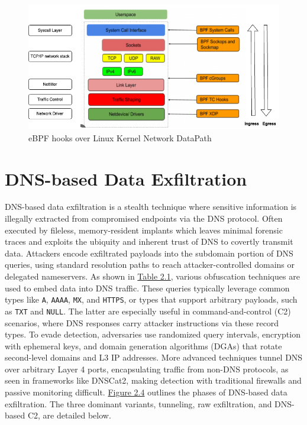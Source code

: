 \documentclass [11pt, proquest] {uwthesis}[2020/02/24]
\begin{document}




\begin{figure}
\includegraphics[width=1.0\textwidth]{images/kernel_datapath.png}
\caption{eBPF hooks over Linux Kernel Network DataPath}
\label{sec:ebpf-hooks-kernel-network-datapath}
\end{figure}


\section{DNS-based Data Exfiltration}
DNS-based data exfiltration is a stealth technique where sensitive information is illegally extracted from compromised endpoints via the DNS protocol. Often executed by fileless, memory-resident implants which leaves minimal forensic traces and exploits the ubiquity and inherent trust of DNS to covertly transmit data. Attackers encode exfiltrated payloads into the subdomain portion of DNS queries, using standard resolution paths to reach attacker-controlled domains or delegated nameservers. As shown in \hyperref[dns_payload_obfuscation]{Table 2.1}, various obfuscation techniques are used to embed data into DNS traffic. These queries typically leverage common types like \texttt{A}, \texttt{AAAA}, \texttt{MX}, and \texttt{HTTPS}, or types that support arbitrary payloads, such as \texttt{TXT} and \texttt{NULL}. The latter are especially useful in command-and-control (C2) scenarios, where DNS responses carry attacker instructions via these record types. To evade detection, adversaries use randomized query intervals, encryption with ephemeral keys, and domain generation algorithms (DGAs) that rotate second-level domains and L3 IP addresses. More advanced techniques tunnel DNS over arbitrary Layer 4 ports, encapsulating traffic from non-DNS protocols, as seen in frameworks like DNSCat2, making detection with traditional firewalls and passive monitoring difficult.
\hyperref[sec:dns c2 flow]{Figure 2.4} outlines the phases of DNS-based data exfiltration. The three dominant variants, tunneling, raw exfiltration, and DNS-based C2, are detailed below.
\end{document}
